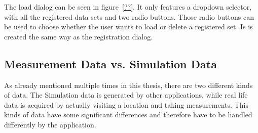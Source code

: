 The load dialog can be seen in figure~\ref{??}. It only features a dropdown selector, with all the registered data sets and two radio buttons. Those radio buttons can be used to choose whether the user wants to load or delete a registered set. Is is created the same way as the registration dialog. 
\subsection{Measurement Data vs. Simulation Data}
As already mentioned multiple times in this thesis, there are two different kinds of data. The Simulation data is generated by other applications, while real life data is acquired by actually visiting a location and taking measurements. This kinds of data have some significant differences and therefore have to be handled differently by the application.